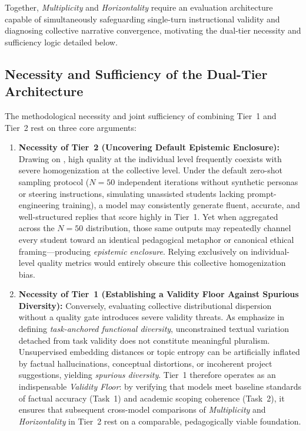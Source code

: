Together, \textit{Multiplicity} and \textit{Horizontality} require an evaluation architecture capable of simultaneously safeguarding single-turn instructional validity and diagnosing collective narrative convergence, motivating the dual-tier necessity and sufficiency logic detailed below.

\subsection{Necessity and Sufficiency of the Dual-Tier Architecture}
\label{subsec:necessity_sufficiency}
The methodological necessity and joint sufficiency of combining Tier~1 and Tier~2 rest on three core arguments:

\begin{enumerate}
  \item \textbf{Necessity of Tier~2 (Uncovering Default Epistemic Enclosure):} Drawing on \cite{Ashkinaze2025}, high quality at the individual level frequently coexists with severe homogenization at the collective level. Under the default zero-shot sampling protocol ($N = 50$ independent iterations without synthetic personas or steering instructions, simulating unassisted students lacking prompt-engineering training), a model may consistently generate fluent, accurate, and well-structured replies that score highly in Tier~1. Yet when aggregated across the $N = 50$ distribution, those same outputs may repeatedly channel every student toward an identical pedagogical metaphor or canonical ethical framing---producing \textit{epistemic enclosure}. Relying exclusively on individual-level quality metrics would entirely obscure this collective homogenization bias.

  \item \textbf{Necessity of Tier~1 (Establishing a Validity Floor Against Spurious Diversity):} Conversely, evaluating collective distributional dispersion without a quality gate introduces severe validity threats. As \cite{Jain2025} emphasize in defining \textit{task-anchored functional diversity}, unconstrained textual variation detached from task validity does not constitute meaningful pluralism. Unsupervised embedding distances or topic entropy can be artificially inflated by factual hallucinations, conceptual distortions, or incoherent project suggestions, yielding \textit{spurious diversity}. Tier~1 therefore operates as an indispensable \textit{Validity Floor}: by verifying that models meet baseline standards of factual accuracy (Task~1) and academic scoping coherence (Task~2), it ensures that subsequent cross-model comparisons of \textit{Multiplicity} and \textit{Horizontality} in Tier~2 rest on a comparable, pedagogically viable foundation.


\end{enumerate}
